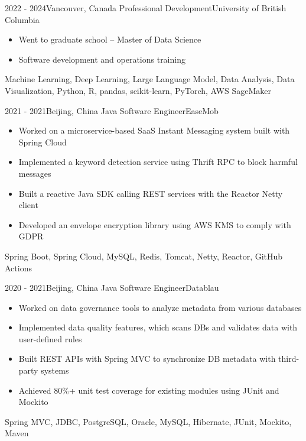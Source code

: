 \begin{experiences}

\experience
{2022 - 2024}{Vancouver, Canada}
{Professional Development}{University of British Columbia}
{
    \begin{itemize}
    \item Went to graduate school -- Master of Data Science
    \item Software development and operations training
    \end{itemize}
}
{Machine Learning, Deep Learning, Large Language Model, Data Analysis, Data Visualization, Python, R, pandas, scikit-learn, PyTorch, AWS SageMaker}

\emptySeparator

\experience
{2021 - 2021}{Beijing, China}
{Java Software Engineer}{EaseMob}
{
    \begin{itemize}
    \item Worked on a microservice-based SaaS Instant Messaging system built with Spring Cloud
    \item Implemented a keyword detection service using Thrift RPC to block harmful messages
    \item Built a reactive Java SDK calling REST services with the Reactor Netty client
    \item Developed an envelope encryption library using AWS KMS to comply with GDPR
    \end{itemize}
}
{Spring Boot, Spring Cloud, MySQL, Redis, Tomcat, Netty, Reactor, GitHub Actions}

\emptySeparator

\experience
{2020 - 2021}{Beijing, China}
{Java Software Engineer}{Datablau}
{
    \begin{itemize}
    \item Worked on data governance tools to analyze metadata from various databases
    \item Implemented data quality features, which scans DBs and validates data with user-defined rules
    \item Built REST APIs with Spring MVC to synchronize DB metadata with third-party systems
    \item Achieved 80\%+ unit test coverage for existing modules using JUnit and Mockito
    \end{itemize}
}
{Spring MVC, JDBC, PostgreSQL, Oracle, MySQL, Hibernate, JUnit, Mockito, Maven}

\emptySeparator


\end{experiences}
